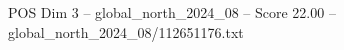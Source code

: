 \begin{textsample}{POS Dim 3 – global\_north\_2024\_08 – Score 22.00 – global\_north\_2024\_08/112651176.txt}
\end{textsample}

